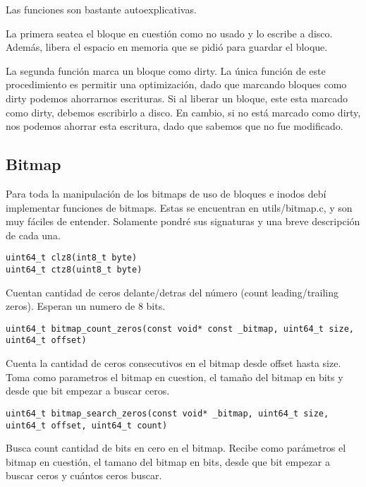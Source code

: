 Las funciones son bastante autoexplicativas.

La primera seatea el bloque en cuestión como no usado y lo escribe a disco. Además, libera el espacio en memoria que se pidió para guardar el bloque.

La segunda función marca un bloque como dirty. La única función de este procedimiento es permitir una optimización, dado que marcando bloques como dirty podemos ahorrarnos escrituras.
Si al liberar un bloque, este esta marcado como dirty, debemos escribirlo a disco. En cambio, si no está marcado como dirty, nos podemos ahorrar esta escritura, dado que sabemos que no fue modificado.


\subsection{Bitmap}

Para toda la manipulación de los bitmaps de uso de bloques e inodos debí implementar funciones de bitmaps. Estas se encuentran en utils/bitmap.c, y son muy fáciles de entender. Solamente pondré sus signaturas y una breve descripción de cada una.


\begin{lstlisting}[style=customc]
uint64_t clz8(int8_t byte)
uint64_t ctz8(uint8_t byte)
\end{lstlisting}

Cuentan cantidad de ceros delante/detras del número (count leading/trailing zeros). Esperan un numero de 8 bits.




\begin{lstlisting}[style=customc]
uint64_t bitmap_count_zeros(const void* const _bitmap, uint64_t size, uint64_t offset)
\end{lstlisting}

Cuenta la cantidad de ceros consecutivos en el bitmap desde offset hasta size.
Toma como parametros el bitmap en cuestion, el tamaño del bitmap en bits y desde que bit empezar a buscar ceros.



\begin{lstlisting}[style=customc]
uint64_t bitmap_search_zeros(const void* _bitmap, uint64_t size, uint64_t offset, uint64_t count)
\end{lstlisting}

Busca count cantidad de bits en cero en el bitmap. Recibe como parámetros el bitmap en cuestión, el tamano del bitmap en bits, desde que bit empezar a buscar ceros y cuántos ceros buscar.

